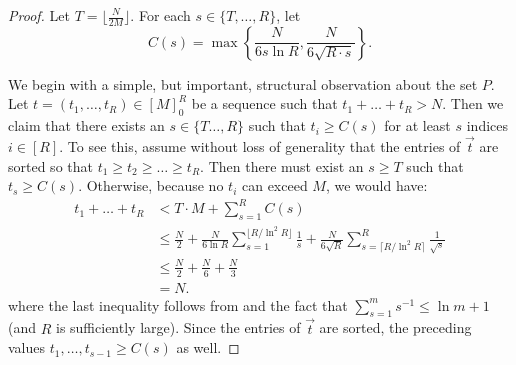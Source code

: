 \documentclass[11pt, letterpaper, fleqn]{article}
\theoremstyle{plain}
\begin{document}
\begin{proof}

Let $T = \lfloor \frac{N}{2M} \rfloor$.  For each $s \in \{T, \dots, R\}$, let 
\[C(s) = \max \left\{ \frac{N}{6 s \ln R}, \frac{N}{6\sqrt{R \cdot s}} \right\}.\]

We begin with a simple, but important, structural observation about the set $P$. Let $t = (t_1, \dots, t_R) \in [M]_0^R$ be a sequence such that $t_1 + \dots + t_R > N$. Then  we claim that there exists an $s \in \{T \dots, R\}$ such that $t_i \ge C(s)$ for at least $s$ indices $i \in [R]$. To see this, assume without loss of generality that the entries of $\vec{t}$ are sorted so that $t_1 \ge t_2 \ge \dots \ge t_R$. Then there must exist an $s \geq T$ such that $t_s \ge C(s)$. Otherwise, because no $t_i$ can exceed $M$, we would have:
\begin{align*}
t_1 + \dots + t_R  &< T \cdot M + \sum_{s = 1}^R C(s) \\
&\le \frac{N}{2} + \frac{N}{6 \ln R} \sum_{s = 1}^{\lfloor R / \ln^2 R \rfloor} \frac{1}{s} + \frac{N}{6\sqrt{R}} \sum_{s = \lceil R / \ln^2 R \rceil}^R \frac{1}{\sqrt{s}}\\
&\le \frac{N}{2}+ \frac{N}{6} + \frac{N}{3} \\
&= N.
\end{align*}
where the last inequality follows from  and the fact that $\sum_{s = 1}^m s^{-1} \le \ln m + 1$ (and $R$ is sufficiently large). 
Since the entries of $\vec{t}$ are sorted, the preceding values $t_1, \dots, t_{s-1} \geq C(s)$ as well. 




\end{proof}
\end{document}

